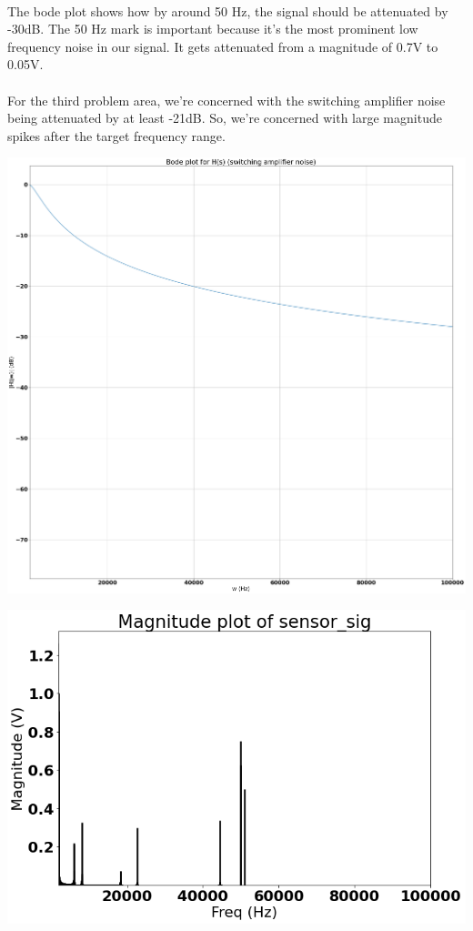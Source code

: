 \documentclass[12pt]{report}
\begin{document}
    \paragraph{} The bode plot shows how by around 50 Hz, the signal should be attenuated by -30dB. The 50 Hz mark is important because it's the most prominent low frequency noise in our signal. It gets attenuated from a magnitude of 0.7V to 0.05V. 
    
    \paragraph{} For the third problem area, we're concerned with the switching amplifier noise being attenuated by at least -21dB. So, we're concerned with large magnitude spikes after the target frequency range.
    
    \includegraphics[scale = 0.2]{Figure 2022-04-20 163927 (9).png}
    
    \includegraphics[scale = 0.5]{Figure 2022-04-20 163927 (4).png}
\end{document}
